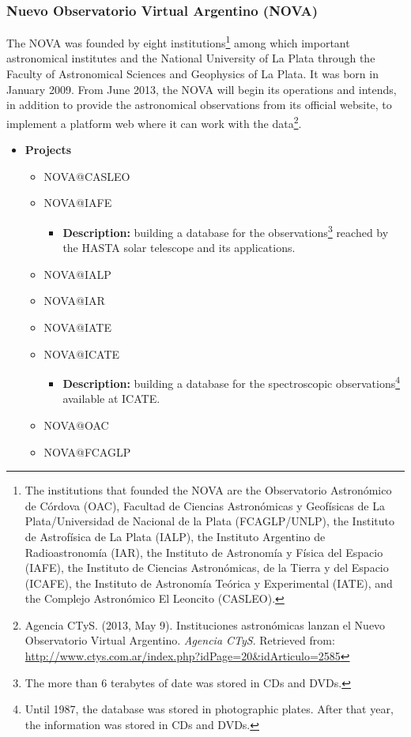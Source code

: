 \subsubsection{Nuevo Observatorio Virtual Argentino (NOVA)}
The NOVA was founded by eight institutions\footnote{The institutions that
founded the NOVA are the Observatorio Astron\'{o}mico de C\'{o}rdova (OAC),
Facultad de Ciencias Astron\'{o}micas y Geof\'{i}sicas de La Plata/Universidad
de Nacional de la Plata (FCAGLP/UNLP), the Instituto de Astrof\'{i}sica de La
Plata (IALP), the Instituto Argentino de Radioastronom\'{i}a (IAR), the
Instituto de Astronom\'{i}a y F\'{i}sica del Espacio (IAFE), the Instituto de
Ciencias Astron\'{o}micas, de la Tierra y del Espacio (ICAFE), the Instituto de
Astronom\'{i}a Te\'{o}rica y Experimental (IATE), and the Complejo
Astron\'{o}mico El Leoncito (CASLEO).} among which important astronomical
institutes and the National University of La Plata through the Faculty of
Astronomical Sciences and Geophysics of La Plata. It was born in January 2009.
From June 2013, the NOVA will begin its operations and intends, in addition to
provide the astronomical observations from its official website, to implement a
platform web where it can work with the data\footnote{Agencia CTyS. (2013, May
9). Instituciones astron\'{o}micas lanzan el Nuevo Observatorio Virtual
Argentino. \textit{Agencia CTyS}. Retrieved from:
\url{http://www.ctys.com.ar/index.php?idPage=20&idArticulo=2585}}.

\begin{itemize}
\item \textbf{Projects}
\begin{itemize}
\item NOVA@CASLEO
\item NOVA@IAFE
\begin{itemize}
\item \textbf{Description:} building a database for the
observations\footnote{The more than 6 terabytes of date was stored in CDs and
DVDs.} reached by the HASTA solar telescope and its applications.
\end{itemize}
\item NOVA@IALP
\item NOVA@IAR
\item NOVA@IATE
\item NOVA@ICATE
\begin{itemize}
\item \textbf{Description:} building a database for the spectroscopic
observations\footnote{Until 1987, the database was stored in photographic
plates. After that year, the information was stored in CDs and DVDs.} available
at ICATE.
\end{itemize}
\item NOVA@OAC
\item NOVA@FCAGLP
\end{itemize}
\end{itemize}

